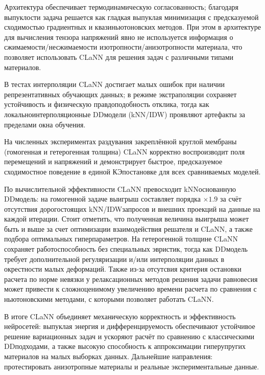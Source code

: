   Архитектура обеспечивает термодинамическую согласованность; благодаря
  выпуклости задача решается как гладкая выпуклая минимизация с предсказуемой сходимостью градиентных и
  квазиньютоновских методов. 
  При этом в архитектуре для вычисления тензора напряжений явно не используется информация о сжимаемости/несжимаемости изотропности/анизотропности
  материала, что позволяет использовать CLaNN для решения задач с различными типами материалов.

  В тестах интерполяции CLaNN достигает малых ошибок при наличии репрезентативных обучающих данных; в режиме
  экстраполяции сохраняет устойчивость и физическую правдоподобность отклика,
  тогда как локально\textendash интерполяционные DD\textendash модели (k\textendash NN/IDW) проявляют артефакты за пределами окна обучения.

  На численных экспериментах раздувания закреплённой круглой мембраны (гомогенная и гетерогенная толщина) CLaNN корректно
  воспроизводит поля перемещений и напряжений и демонстрирует быстрое, предсказуемое сходимостное поведение в единой
  КЭ\textendash постановке для всех сравниваемых моделей.

  По вычислительной эффективности CLaNN превосходит kNN\textendash основанную DD\textendash модель: на гомогенной задаче выигрыш составляет
  порядка $\times 1.9$ за счёт отсутствия дорогостоящих k\textendash NN/IDW\textendash запросов и внешних проекций на данные на каждой итерации. 
  Стоит отметить, что полученная величина выигрыша может быть и выше за счет оптимизации взаимодействия решателя и CLaNN, а также подбора оптимальных гиперпараметров.
  На гетерогенной толщине CLaNN сохраняет работоспособность без специальных эвристик, 
  тогда как DD\textendash модель требует дополнительной регуляризации и/или интерполяции данных в окрестности малых деформаций.
  Также из-за отсутсвия критерия остановки расчета по норме невязки у релаксационных методов решения задачи равновесия может привести к сложноценимому увеличению времени расчета
  по сравнения с ньютоновскими методами, с которыми позволяет работать CLaNN.

  В итоге CLaNN объединяет механическую корректность и эффективность нейросетей: выпуклая энергия и дифференцируемость обеспечивают устойчивое 
  решение вариационных задач и ускоряют расчёт по сравнению с классическими DD\textendash подходами, а также высокую способность к аппроксимации гиперупругих материалов
  на малых выборках данных. 
  Дальнейшие направления: протестировать анизотропные материалы и реальные экспериментальные данные.


